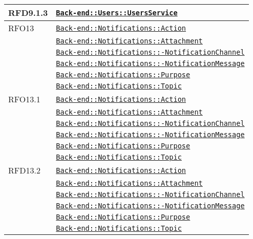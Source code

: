 \begin{longtable}{|>{\centering}m{3cm}|m{10cm}<{\centering}|}
RFD9.1.3 & \hyperref[Back-end::Users::UsersService]{\texttt{Back-end::Users::UsersService}}\\ \hline

RFO13 & \hyperref[Back-end::Notifications::Action]{\texttt{Back-end::Notifications::Action}}\\
& \hyperref[Back-end::Notifications::Attachment]{\texttt{Back-end::Notifications::Attachment}}\\
& \hyperref[Back-end::Notifications::NotificationChannel]{\texttt{Back-end::Notifications::-\linebreak NotificationChannel}}\\
& \hyperref[Back-end::Notifications::NotificationMessage]{\texttt{Back-end::Notifications::-\linebreak NotificationMessage}}\\
& \hyperref[Back-end::Notifications::Purpose]{\texttt{Back-end::Notifications::Purpose}}\\
& \hyperref[Back-end::Notifications::Topic]{\texttt{Back-end::Notifications::Topic}}\\ \hline

RFO13.1 & \hyperref[Back-end::Notifications::Action]{\texttt{Back-end::Notifications::Action}}\\
& \hyperref[Back-end::Notifications::Attachment]{\texttt{Back-end::Notifications::Attachment}}\\
& \hyperref[Back-end::Notifications::NotificationChannel]{\texttt{Back-end::Notifications::-\linebreak NotificationChannel}}\\
& \hyperref[Back-end::Notifications::NotificationMessage]{\texttt{Back-end::Notifications::-\linebreak NotificationMessage}}\\
& \hyperref[Back-end::Notifications::Purpose]{\texttt{Back-end::Notifications::Purpose}}\\
& \hyperref[Back-end::Notifications::Topic]{\texttt{Back-end::Notifications::Topic}}\\ \hline

RFD13.2 & \hyperref[Back-end::Notifications::Action]{\texttt{Back-end::Notifications::Action}}\\
& \hyperref[Back-end::Notifications::Attachment]{\texttt{Back-end::Notifications::Attachment}}\\
& \hyperref[Back-end::Notifications::NotificationChannel]{\texttt{Back-end::Notifications::-\linebreak NotificationChannel}}\\
& \hyperref[Back-end::Notifications::NotificationMessage]{\texttt{Back-end::Notifications::-\linebreak NotificationMessage}}\\
& \hyperref[Back-end::Notifications::Purpose]{\texttt{Back-end::Notifications::Purpose}}\\
& \hyperref[Back-end::Notifications::Topic]{\texttt{Back-end::Notifications::Topic}}\\ \hline


\end{longtable}
